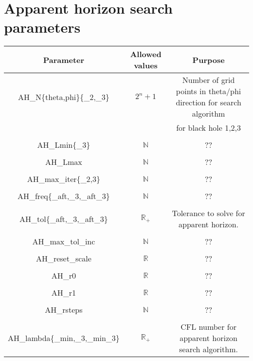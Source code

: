 \documentclass{article}
\begin{document}
\newpage
\section*{Apparent horizon search parameters}

\begin{table}[h]
   \centering 
   \begin{tabular}{ccc}
      Parameter  & Allowed values & Purpose \\
      \midrule\midrule
      AH\_N\{theta,phi\}\{\_2,\_3\} 
      &
      $2^n+1$
      &
      Number of grid points in theta/phi direction for search algorithm
      \\
      & & for black hole 1,2,3
      \\ \\
      AH\_Lmin\{\_3\} 
      &
      $\mathbb{N}$
      &
      ??
      \\ \\
      AH\_Lmax 
      &
      $\mathbb{N}$
      &
      ??
      \\ \\
      AH\_max\_iter\{\_2,3\} 
      &
      $\mathbb{N}$
      &
      ??
      \\ \\
      AH\_freq\{\_aft,\_3,\_aft\_3\}
      &
      $\mathbb{N}$
      &
      ??
      \\ \\
      AH\_tol\{\_aft,\_3,\_aft\_3\}
      &
      $\mathbb{R}_+$
      &
      Tolerance to solve for apparent horizon.
      \\ \\
      AH\_max\_tol\_inc 
      &
      $\mathbb{N}$
      &
      ??
      \\ \\
      AH\_reset\_scale 
      &
      $\mathbb{R}$
      &
      ??
      \\ \\
      AH\_r0 
      &
      $\mathbb{R}$
      &
      ??
      \\ \\
      AH\_r1 
      &
      $\mathbb{R}$
      &
      ??
      \\ \\
      AH\_rsteps &
      $\mathbb{N}$
      &
      ??
      \\ \\
      AH\_lambda\{\_min,\_3,\_min\_3\}
      &
      $\mathbb{R}_+$
      &
      CFL number for apparent horizon search algorithm.

\end{tabular}
\end{table}
\end{document}
